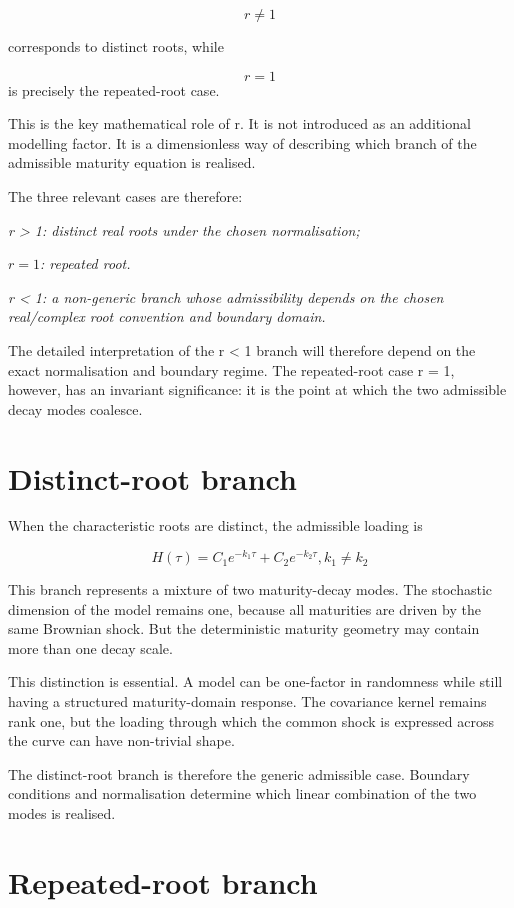 \documentclass[11pt,oneside]{book}
\begin{document}
\[
r \neq 1
\]

corresponds to distinct roots, while

\[
r = 1
\]
is precisely the repeated-root case.

This is the key mathematical role of r. It is not introduced as an
additional modelling factor. It is a dimensionless way of describing
which branch of the admissible maturity equation is realised.

The three relevant cases are therefore:

\emph{r \textgreater{} 1: distinct real roots under the chosen
normalisation;}

\begin{center}\emph{\(r=1\): repeated root.}\end{center}
\emph{r \textless{} 1: a non-generic branch whose admissibility depends
on the chosen real/complex root convention and boundary domain.}

The detailed interpretation of the r \textless{} 1 branch will therefore
depend on the exact normalisation and boundary regime. The repeated-root
case r = 1, however, has an invariant significance: it is the point at
which the two admissible decay modes coalesce.

\section{Distinct-root branch}\label{distinct-root-branch}

When the characteristic roots are distinct, the admissible loading is

\[
H(\tau) = C_1e^{-k_1\tau} + C_2e^{-k_2\tau}, k_1 \neq k_2
\]

This branch represents a mixture of two maturity-decay modes. The
stochastic dimension of the model remains one, because all maturities
are driven by the same Brownian shock. But the deterministic maturity
geometry may contain more than one decay scale.

This distinction is essential. A model can be one-factor in randomness
while still having a structured maturity-domain response. The covariance
kernel remains rank one, but the loading through which the common shock
is expressed across the curve can have non-trivial shape.

The distinct-root branch is therefore the generic admissible case.
Boundary conditions and normalisation determine which linear combination
of the two modes is realised.

\section{Repeated-root branch}\label{repeated-root-branch}
\end{document}
